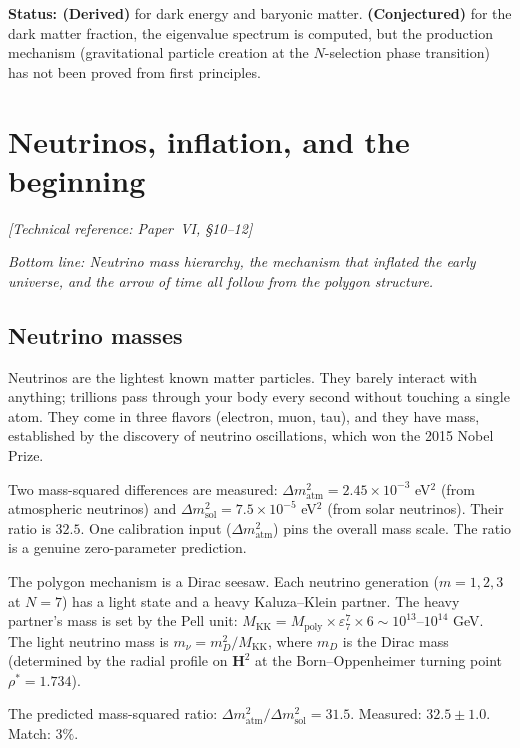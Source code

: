 \textbf{Status: (Derived)} for dark energy and baryonic matter.
\textbf{(Conjectured)} for the dark matter fraction, the eigenvalue
spectrum is computed, but the production mechanism (gravitational
particle creation at the $N$-selection phase transition) has not been
proved from first principles.


\section{Neutrinos, inflation, and the beginning}
\noindent\textit{[Technical reference: Paper~VI, \S10--12]}

\medskip

\noindent\textit{Bottom line: Neutrino mass hierarchy, the
mechanism that inflated the early universe, and the arrow of time all
follow from the polygon structure.}

\medskip

\subsection*{Neutrino masses}

Neutrinos are the lightest known matter particles. They barely
interact with anything; trillions pass through your body every second
without touching a single atom. They come in three flavors (electron,
muon, tau), and they have mass, established by the discovery of
neutrino oscillations, which won the 2015 Nobel Prize.

Two mass-squared differences are measured: $\Delta m^2_{\mathrm{atm}}
= 2.45 \times 10^{-3}$ eV$^2$ (from atmospheric neutrinos) and
$\Delta m^2_{\mathrm{sol}} = 7.5 \times 10^{-5}$ eV$^2$ (from solar
neutrinos). Their ratio is $32.5$. One calibration input
($\Delta m^2_{\mathrm{atm}}$) pins the overall mass scale. The ratio
is a genuine zero-parameter prediction.

The polygon mechanism is a Dirac seesaw. Each neutrino generation
($m = 1, 2, 3$ at $N = 7$) has a light state and a heavy
Kaluza--Klein partner. The heavy partner's mass is set by the Pell
unit: $M_{\mathrm{KK}} = M_{\mathrm{poly}} \times \varepsilon_7^7
\times 6 \sim 10^{13}$--$10^{14}$ GeV. The light neutrino mass is
$m_\nu = m_D^2/M_{\mathrm{KK}}$, where $m_D$ is the Dirac mass
(determined by the radial profile on $\mathbf{H}^2$ at the
Born--Oppenheimer turning point $\rho^* = 1.734$).

The predicted mass-squared ratio:
$\Delta m^2_{\mathrm{atm}}/\Delta m^2_{\mathrm{sol}} = 31.5$.
Measured: $32.5 \pm 1.0$. Match: $3\%$.

